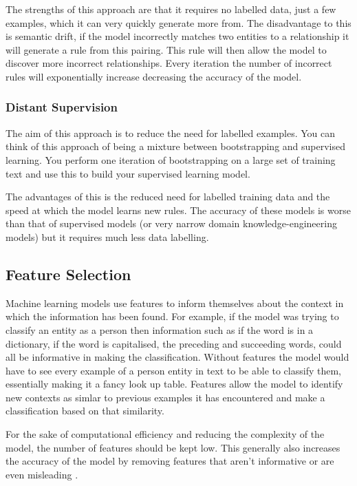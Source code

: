 \documentclass[11pt,oneside]{book}
\begin{document}
The strengths of this approach are that it requires no labelled data, just a few examples, which it can very quickly generate more from. The disadvantage to this is semantic drift, if the model incorrectly matches two entities to a relationship it will generate a rule from this pairing. This rule will then allow the model to discover more incorrect relationships. Every iteration the number of incorrect rules will exponentially increase decreasing the accuracy of the model.

\subsubsection{Distant Supervision}

The aim of this approach is to reduce the need for labelled examples. You can think of this approach of being a mixture between bootstrapping and supervised learning. You perform one iteration of bootstrapping on a large set of training text and use this to build your supervised learning model.

The advantages of this is the reduced need for labelled training data and the speed at which the model learns new rules. The accuracy of these models is worse than that of supervised models (or very narrow domain knowledge-engineering models) but it requires much less data labelling.

\subsection{Feature Selection}

Machine learning models use features to inform themselves about the context in which the information has been found. For example, if the model was trying to classify an entity as a person then information such as if the word is in a dictionary, if the word is capitalised, the preceding and succeeding words, could all be informative in making the classification. Without features the model would have to see every example of a person entity in text to be able to classify them, essentially making it a fancy look up table. Features allow the model to identify new contexts as simlar to previous examples it has encountered and make a classification based on that similarity.

For the sake of computational efficiency and reducing the complexity of the model, the number of features should be kept low. This generally also increases the accuracy of the model by removing features that aren't informative or are even misleading \citep{feature_selection}.
\end{document}
